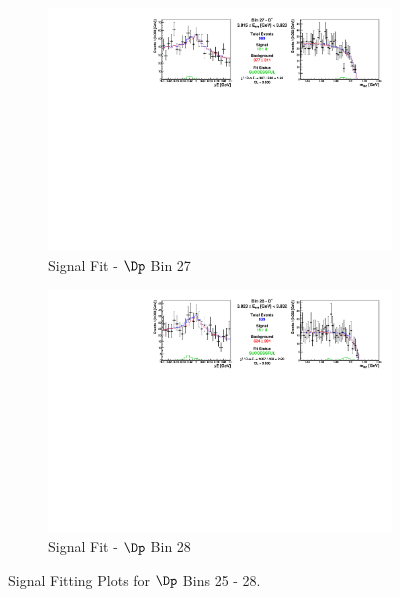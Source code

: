 \begin{figure}[h]
\begin{subfigure}[c]{0.99\textwidth}
\includegraphics[width=\textwidth]{figures/plots/fit_results/Dp_bin_27.pdf}
\caption*{Signal Fit - $\Dp$ Bin 27}
\end{subfigure}

\vspace{5pt}

\begin{subfigure}[c]{0.99\textwidth}
\includegraphics[width=\textwidth]{figures/plots/fit_results/Dp_bin_28.pdf}
\caption*{Signal Fit - $\Dp$ Bin 28}
\end{subfigure}

\caption{Signal Fitting Plots for $\Dp$ Bins 25 - 28.}
\label{fig:Dp_plots_25_28}

\end{figure}


